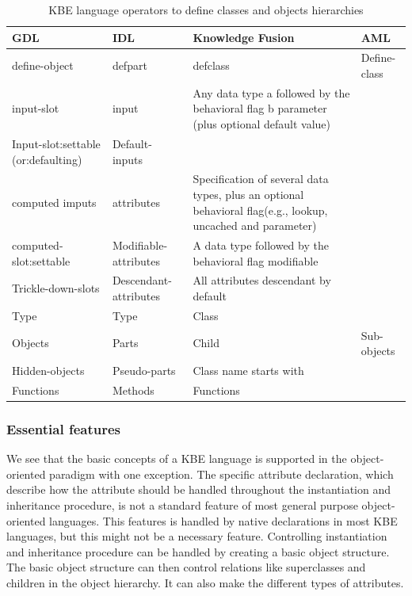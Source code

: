 \begin{table}[ctb]
  \begin{center}
    \begin{tabular}{p{4cm}lp{5cm}l}
    \hline
    \textbf{GDL} & \textbf{IDL} & \textbf{Knowledge Fusion} & \textbf{AML} \\
    \hline
      define-object & defpart & defclass & Define-class \\
      input-slot & input & Any data type a followed by the behavioral flag b parameter (plus optional default value)&\\
      Input-slot:settable (or:defaulting) & Default-inputs&&\\
      computed imputs& attributes&Specification of several data types, plus an optional behavioral flag(e.g., lookup, uncached and parameter) &\\
      computed-slot:settable  &Modifiable-attributes&A data type followed by the behavioral flag modifiable&\\
      Trickle-down-slots &Descendant-attributes&All attributes descendant by default&\\
      Type &Type&Class&\\
      Objects&Parts&Child&Sub-objects\\
      Hidden-objects &Pseudo-parts& Class name starts with&\\
      Functions &Methods&Functions&\\
    \hline
    \end{tabular}
  \end{center}
  \caption{KBE language operators to define classes and objects hierarchies}
  \label{tab:languageParts}
\end{table}


\subsubsection{Essential features} %
\label{ssub:essential_features}
We see that the basic concepts of a KBE language is supported in the object-oriented paradigm \citep{rocca} with one exception. The specific attribute declaration, which describe how the attribute should be handled throughout the instantiation and inheritance procedure, is not a standard feature of most general purpose object-oriented languages. This features is handled by native declarations in most KBE languages, but this might not be a necessary feature. Controlling instantiation and inheritance procedure can be handled by creating a basic object structure. The basic object structure can then control relations like superclasses and children in the object hierarchy. It can also make the different types of attributes.

